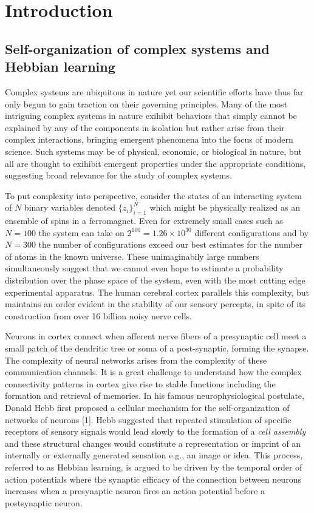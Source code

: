 \documentclass{ucetd}
\begin{document}
\mainmatter

\chapter{Introduction}

\section{Self-organization of complex systems and Hebbian learning}

Complex systems are ubiquitous in nature yet our scientific efforts have thus far only begun to gain traction on their governing principles. Many of the most intriguing complex systems in nature exihibit behaviors that simply cannot be explained by any of the components in isolation but rather arise from their complex interactions, bringing emergent phenomena into the focus of modern science. Such systems may be of physical, economic, or biological in nature, but all are thought to exihibit emergent properties under the appropriate conditions, suggesting broad relevance for the study of complex systems. 

To put complexity into perspective, consider the states of an interacting system of $N$ binary variables denoted $\{z_{i}\}_{i=1}^{N}$ which might be physically realized as an ensemble of spins in a ferromagnet. Even for extremely small cases such as $N=100$ the system can take on $2^{100} = 1.26\times 10^{30}$ different configurations and by $N=300$ the number of configurations exceed our best estimates for the number of atoms in the known universe. These unimaginabily large numbers simultaneously suggest that we cannot even hope to estimate a probability distribution over the phase space of the system, even with the most cutting edge experimental apparatus. The human cerebral cortex parallels this complexity, but maintains an order evident in the stability of our sensory percepts, in spite of its construction from over 16 billion noisy nerve cells. 

Neurons in cortex connect when afferent nerve fibers of a presynaptic cell meet a small patch of the dendritic tree or soma of a post-synaptic, forming the synapse. The complexity of neural networks arises from the complexity of these communication channels. It is a great challenge to understand how the complex connectivity patterns in cortex give rise to stable functions including the formation and retrieval of memories. In his famous neurophysiological postulate, Donald Hebb first proposed a cellular mechanism for the self-organization of networks of neurons [1]. Hebb suggested that repeated stimulation of specific receptors of sensory signals would lead slowly to the formation of a \emph{cell assembly} and these structural changes would constitute a representation or imprint of an internally or externally generated sensation e.g., an image or idea. This process, referred to as Hebbian learning, is argued to be driven by the temporal order of action potentials where the synaptic efficacy of the connection between neurons increases when a presynaptic neuron fires an action potential before a postsynaptic neuron.
\end{document}
